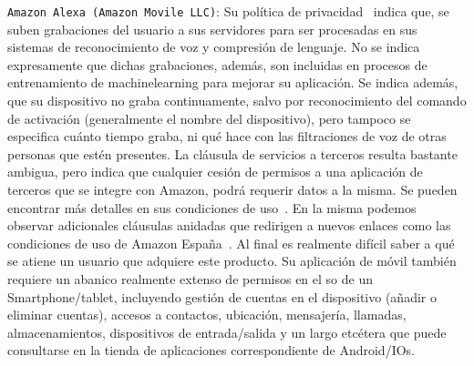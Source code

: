 \vspace{1cm}

\verb|Amazon Alexa (Amazon Movile LLC)|: Su política de privacidad~\cite{alexaprivacy} indica que, se suben grabaciones del usuario a sus servidores para ser procesadas en sus sistemas de reconocimiento de voz y compresión de lenguaje. No se indica expresamente que dichas grabaciones, además, son incluidas en procesos de entrenamiento de \gls{machinelearning} para mejorar su aplicación. Se indica además, que su dispositivo no graba continuamente, salvo por reconocimiento del comando de activación (generalmente el nombre del dispositivo), pero tampoco se especifica cuánto tiempo graba, ni qué hace con las filtraciones de voz de otras personas que estén presentes. La cláusula de servicios a terceros resulta bastante ambigua, pero indica que cualquier cesión de permisos a una aplicación de terceros que se integre con Amazon, podrá requerir datos a la misma. Se pueden encontrar más detalles en sus condiciones de uso~\cite{Alexauserconditions}. En la misma podemos observar adicionales cláusulas anidadas que redirigen a nuevos enlaces como las condiciones de uso de Amazon España~\cite{Alexaspainuserconditions}. Al final es realmente difícil saber a qué se atiene un usuario que adquiere este producto. Su aplicación de móvil también requiere un abanico realmente extenso de permisos en el \gls{so} de un Smartphone/tablet, incluyendo gestión de cuentas en el dispositivo (añadir o eliminar cuentas), accesos a contactos, ubicación, mensajería, llamadas, almacenamientos, dispositivos de entrada/salida y un largo etcétera que puede consultarse en la tienda de aplicaciones correspondiente de Android/IOs.

\vspace{1cm}

